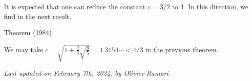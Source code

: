 It is expected that one can reduce the constant $c=3/2$ to 1. In this
direction, we find in
\cite{Preissmann*84}
the next result.
\par 
\begin{thm}{Theorem (1984)}

We may take $\displaystyle c= \sqrt{1+\tfrac23\sqrt{\tfrac65}} =
1.3154\cdots < 4/3$ in the previous theorem.
\end{thm}



 
 








  
\begin{flushright}\small\sl{}   Last updated on February 7th, 2024, by Olivier Ramar\'e
 \end{flushright}















